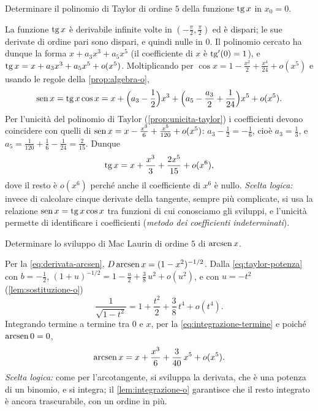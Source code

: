 \begin{esercizio}\label{es:sviluppo-tangente}
Determinare il polinomio di Taylor di ordine $5$ della funzione $\operatorname{tg} x$ in $x_{0}=0$.
\begin{soluzione}
La funzione $\operatorname{tg} x$ è derivabile infinite volte in $(-\frac\pi2,\frac\pi2)$ ed è dispari; le sue
derivate di ordine pari sono dispari, e quindi nulle in $0$. Il polinomio cercato ha
dunque la forma $x+a_{3}x^{3}+a_{5}x^{5}$ (il coefficiente di $x$ è $\operatorname{tg}'(0)=1$), e
$\operatorname{tg} x=x+a_{3}x^{3}+a_{5}x^{5}+o(x^{5})$. Moltiplicando per
$\cos x=1-\frac{x^{2}}2+\frac{x^{4}}{24}+o(x^{5})$ e usando le regole della \cref{prop:algebra-o},
\[
  \operatorname{sen} x=\operatorname{tg} x\cos x=x+\Bigl(a_{3}-\frac12\Bigr)x^{3}+\Bigl(a_{5}-\frac{a_{3}}2+\frac1{24}\Bigr)x^{5}+o(x^{5}) .
\]
Per l'unicità del polinomio di Taylor (\cref{prop:unicita-taylor}) i coefficienti devono
coincidere con quelli di $\operatorname{sen} x=x-\frac{x^{3}}6+\frac{x^{5}}{120}+o(x^{5})$: $a_{3}-\frac12=-\frac16$, cioè
$a_{3}=\frac13$, e $a_{5}=\frac1{120}+\frac16-\frac1{24}=\frac2{15}$. Dunque
\[
  \operatorname{tg} x=x+\frac{x^{3}}3+\frac{2x^{5}}{15}+o(x^{6}) ,
\]
dove il resto è $o(x^{6})$ perché anche il coefficiente di $x^{6}$ è nullo.
\emph{Scelta logica:} invece di calcolare cinque derivate della tangente, sempre più complicate, si
usa la relazione $\operatorname{sen} x=\operatorname{tg} x\cos x$ tra funzioni di cui conosciamo gli sviluppi, e
l'unicità permette di identificare i coefficienti (\emph{metodo dei coefficienti
indeterminati}).
\end{soluzione}
\end{esercizio}

\begin{esercizio}
Determinare lo sviluppo di Mac Laurin di ordine $5$ di $\operatorname{arcsen} x$.
\begin{soluzione}
Per la \eqref{eq:derivata-arcsen}, $D\operatorname{arcsen} x=(1-x^{2})^{-1/2}$. Dalla \eqref{eq:taylor-potenza}
con $b=-\frac12$, $(1+u)^{-1/2}=1-\frac u2+\frac38\,u^{2}+o(u^{2})$, e con $u=-t^{2}$ (\cref{lem:sostituzione-o})
\[
  \frac1{\sqrt{1-t^{2}}}=1+\frac{t^{2}}2+\frac38\,t^{4}+o(t^{4}) .
\]
Integrando termine a termine tra $0$ e $x$, per la \eqref{eq:integrazione-termine} e poiché
$\operatorname{arcsen}0=0$,
\[
  \operatorname{arcsen} x=x+\frac{x^{3}}6+\frac3{40}\,x^{5}+o(x^{5}) .
\]
\emph{Scelta logica:} come per l'arcotangente, si sviluppa la derivata, che è una
potenza di un binomio, e si integra; il \cref{lem:integrazione-o} garantisce che il resto
integrato è ancora trascurabile, con un ordine in più.
\end{soluzione}
\end{esercizio}

